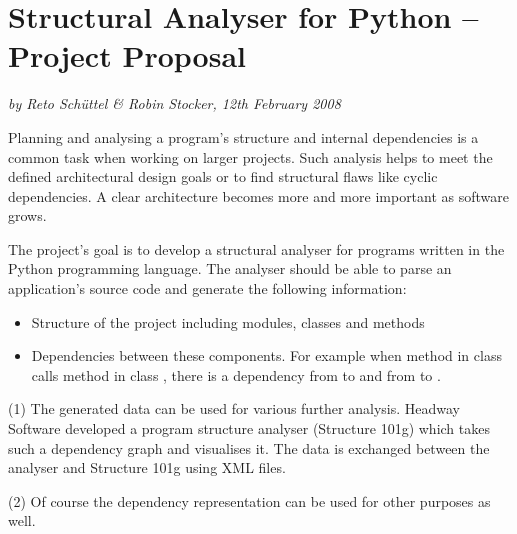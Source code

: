 \documentclass[12pt,halfparskip]{scrartcl}
\begin{document}
\pagestyle{plain}

\section*{Structural Analyser for Python – Project Proposal}
\vspace{-0.5cm}

\emph{by Reto Schüttel \& Robin Stocker, 12th February 2008}

\vspace{0.2cm}

Planning and analysing a program's structure and internal dependencies is a common task when working on larger projects. Such analysis helps to meet the defined architectural design goals or to find structural flaws like cyclic dependencies. A clear architecture becomes more and more important as software grows.

The project's goal is to develop a structural analyser for programs written in the Python programming language. The analyser should be able to parse an application's source code and generate the following information:

\begin{itemize}
	\item Structure of the project including modules, classes and methods
	\item Dependencies between these components. For example when method  in class  calls method  in class , there is a dependency from  to  and from  to .
\end{itemize}

(1) The generated data can be used for various further analysis. Headway Software developed a program structure analyser (Structure 101g) which takes such a dependency graph and visualises it. The data is exchanged between the analyser and Structure 101g using XML files.

(2) Of course the dependency representation can be used for other purposes as well.
\end{document}
